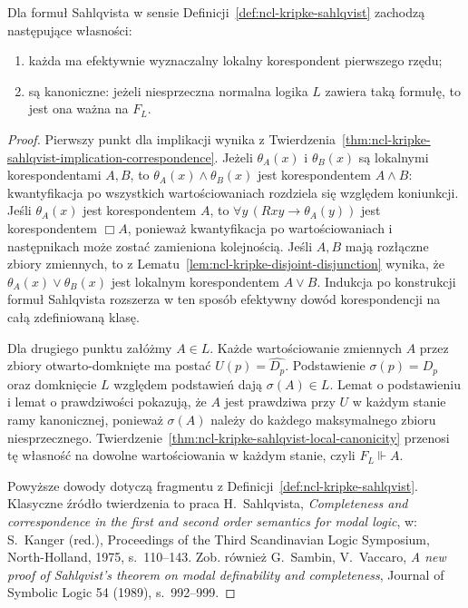 \begin{twierdzenie}
\label{thm:ncl-kripke-sahlqvist}
Dla formuł Sahlqvista w sensie
Definicji~\ref{def:ncl-kripke-sahlqvist}
zachodzą następujące własności:
\begin{enumerate}
 \item każda ma efektywnie wyznaczalny
       lokalny korespondent pierwszego rzędu;
 \item są kanoniczne: jeżeli niesprzeczna
       normalna logika $L$ zawiera taką
       formułę, to jest ona ważna na $F_L$.
\end{enumerate}
\end{twierdzenie}
\begin{proof}
Pierwszy punkt dla implikacji wynika z
Twierdzenia~\ref{thm:ncl-kripke-sahlqvist-implication-correspondence}.
Jeżeli $\theta_A(x)$ i $\theta_B(x)$ są
lokalnymi korespondentami $A,B$, to
$\theta_A(x)\wedge\theta_B(x)$ jest
korespondentem $A\wedge B$: kwantyfikacja
po wszystkich wartościowaniach rozdziela
się względem koniunkcji.
Jeśli $\theta_A(x)$ jest korespondentem $A$,
to $\forall y\,(Rxy\to\theta_A(y))$ jest
korespondentem $\Box A$, ponieważ
kwantyfikacja po wartościowaniach i
następnikach może zostać zamieniona kolejnością.
Jeśli $A,B$ mają rozłączne zbiory zmiennych,
to z Lematu~\ref{lem:ncl-kripke-disjoint-disjunction}
wynika, że $\theta_A(x)\vee\theta_B(x)$
jest lokalnym korespondentem $A\vee B$.
Indukcja po konstrukcji formuł Sahlqvista
rozszerza w ten sposób efektywny dowód
korespondencji na całą zdefiniowaną klasę.

Dla drugiego punktu załóżmy $A\in L$.
Każde wartościowanie zmiennych $A$ przez
zbiory otwarto-domknięte ma postać
$U(p)=\widehat{D_p}$.
Podstawienie $\sigma(p)=D_p$ oraz
domknięcie $L$ względem podstawień
dają $\sigma(A)\in L$.
Lemat o podstawieniu i lemat o prawdziwości
pokazują, że $A$ jest prawdziwa przy $U$
w każdym stanie ramy kanonicznej, ponieważ
$\sigma(A)$ należy do każdego maksymalnego
zbioru niesprzecznego.
Twierdzenie~\ref{thm:ncl-kripke-sahlqvist-local-canonicity}
przenosi tę własność na dowolne wartościowania
w każdym stanie, czyli $F_L\Vdash A$.

Powyższe dowody dotyczą fragmentu z
Definicji~\ref{def:ncl-kripke-sahlqvist}.
Klasyczne źródło twierdzenia to praca
H.~Sahlqvista, \emph{Completeness and
correspondence in the first and second order
semantics for modal logic}, w: S.~Kanger (red.),
Proceedings of the Third Scandinavian Logic
Symposium, North-Holland, 1975, s.~110--143.
Zob. również G.~Sambin, V.~Vaccaro,
\emph{A new proof of Sahlqvist's theorem on
modal definability and completeness},
Journal of Symbolic Logic 54 (1989),
s.~992--999.
\end{proof}


